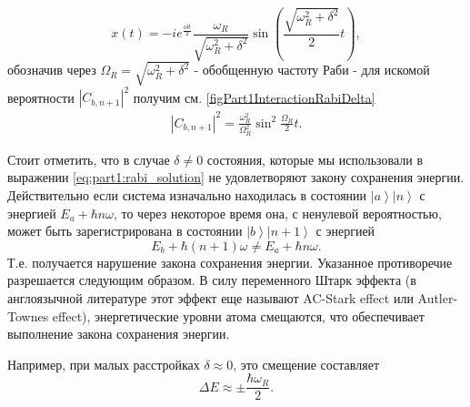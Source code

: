 \begin{equation}
  x\left(t\right) = -  i e^{\frac{ i \delta t}{2}}
  \frac{\omega_R}{\sqrt{\omega_R^2 + \delta^2}}
  \sin{\left(\frac{\sqrt{\omega_R^2 + \delta^2}}{2}t\right)},
  \nonumber
\end{equation}
обозначив через $\Omega_R = \sqrt{\omega_R^2 + \delta^2}$ -
обобщенную частоту Раби - для искомой вероятности
$\left|C_{b,n+1}\right|^2$ получим см. \autoref{figPart1InteractionRabiDelta}
\begin{eqnarray}
  \left|C_{b,n+1}\right|^2 =  \frac{\omega_R^2}{\Omega_R^2}
  \sin^2{\frac{\Omega_R}{2} t}.
  \label{eqPart1InteractionRabiProbability}
\end{eqnarray}



\begin{remark}
  Стоит отметить, что в случае $\delta \ne 0$ состояния, которые мы
  использовали в выражении \ref{eq:part1:rabi_solution} не
  удовлетворяют закону сохранения энергии. Действительно если система
  изначально находилась в состоянии $\left|a\right>\left|n\right>$ с
  энергией $E_a + \hbar n \omega$, то через некоторое время она,
  с ненулевой вероятностью,
  может
  быть зарегистрирована в состоянии
  $\left|b\right>\left|n+1\right>$ с энергией
  \[
  E_b + \hbar (n+1)
  \omega \ne E_a + \hbar n \omega.
  \]
  Т.е. получается нарушение закона
  сохранения энергии. Указанное противоречие разрешается следующим
  образом. В силу переменного Штарк эффекта
  (в англоязычной литературе этот эффект еще называют AC-Stark effect или
  Autler-Townes effect)\cite{wiki:autler_townes_effect},
  энергетические уровни атома смещаются, 
  что обеспечивает выполнение закона сохранения энергии.

  Например,
  при малых расстройках $\delta \approx 0$, это смещение составляет
  \cite{wiki:autler_townes_effect} 
  \[
  \Delta E \approx \pm \frac{\hbar \omega_R}{2}.
  \]
\end{remark}
